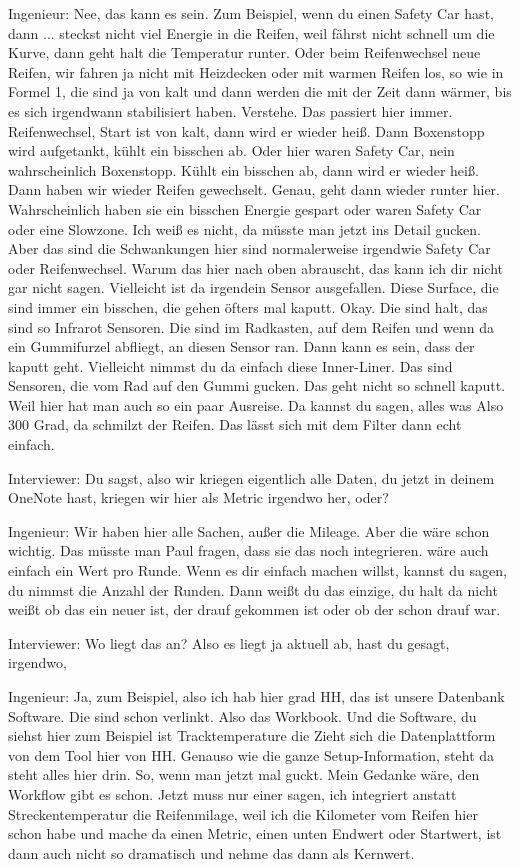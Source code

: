 Ingenieur:
Nee, das kann es sein. Zum Beispiel, wenn du einen Safety Car hast, dann  ...  steckst nicht viel Energie in die Reifen, weil fährst nicht schnell um die Kurve, dann geht halt die Temperatur runter. Oder beim Reifenwechsel neue Reifen, wir fahren ja nicht mit Heizdecken oder mit warmen Reifen los, so wie in Formel 1, die sind ja von kalt und dann werden die mit der Zeit dann wärmer, bis es sich irgendwann stabilisiert haben. Verstehe. Das passiert hier immer.  Reifenwechsel, Start ist von kalt, dann wird er wieder heiß. Dann Boxenstopp wird aufgetankt, kühlt ein bisschen ab. Oder hier waren Safety Car, nein wahrscheinlich Boxenstopp. Kühlt ein bisschen ab, dann wird er wieder heiß. Dann haben wir wieder Reifen gewechselt. Genau, geht dann wieder runter hier. Wahrscheinlich haben sie ein bisschen Energie gespart oder waren Safety Car oder eine Slowzone. Ich weiß es nicht, da müsste man jetzt ins Detail gucken. Aber das sind die Schwankungen hier sind normalerweise irgendwie Safety Car oder Reifenwechsel. Warum das hier nach oben abrauscht, das kann ich dir nicht gar nicht sagen. Vielleicht ist da irgendein Sensor ausgefallen. Diese Surface, die sind immer ein bisschen, die gehen öfters mal kaputt. Okay. Die sind halt, das sind so Infrarot Sensoren. Die sind im Radkasten, auf dem Reifen und wenn da ein Gummifurzel abfliegt, an diesen Sensor ran. Dann kann es sein, dass der kaputt geht. Vielleicht nimmst du da einfach diese Inner-Liner. Das sind Sensoren, die vom Rad auf den Gummi gucken. Das geht nicht so schnell kaputt. Weil hier hat man auch so ein paar Ausreise. Da kannst du sagen, alles was Also 300 Grad, da schmilzt der Reifen. Das lässt sich mit dem Filter dann echt einfach.  

Interviewer:
Du sagst, also wir kriegen eigentlich alle Daten, du jetzt in deinem OneNote hast, kriegen wir hier als Metric irgendwo her, oder?  

Ingenieur:
Wir haben hier alle Sachen, außer die Mileage. Aber die wäre schon wichtig.  Das müsste man Paul fragen, dass sie das noch integrieren.  wäre auch einfach ein Wert pro Runde. Wenn es dir einfach machen willst, kannst du sagen, du nimmst die Anzahl der Runden. Dann weißt du das einzige, du halt da nicht weißt ob das ein neuer ist, der drauf gekommen ist oder ob der schon drauf war. 

Interviewer:
Wo liegt das an? Also es liegt ja aktuell ab, hast du gesagt, irgendwo, 

Ingenieur:
Ja, zum Beispiel, also ich hab hier grad HH, das ist unsere Datenbank Software. Die sind schon verlinkt. Also das Workbook. Und die Software, du siehst hier zum Beispiel ist Tracktemperature die Zieht sich die Datenplattform von dem Tool hier von HH. Genauso wie die ganze Setup-Information, steht da steht alles hier drin. So, wenn man jetzt mal guckt.   Mein Gedanke wäre, den Workflow gibt es schon. Jetzt muss nur einer sagen, ich integriert anstatt Streckentemperatur die Reifenmilage, weil ich die Kilometer vom Reifen hier schon habe und mache da einen Metric, einen unten Endwert oder Startwert, ist dann auch nicht so dramatisch und nehme das dann als Kernwert.  


